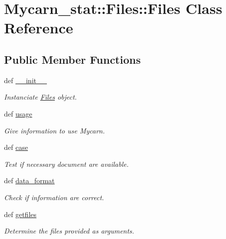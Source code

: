 \hypertarget{classMycarn__stat_1_1Files_1_1Files}{
\section{\-Mycarn\-\_\-stat\-:\-:\-Files\-:\-:\-Files \-Class \-Reference}
\label{classMycarn__stat_1_1Files_1_1Files}
}
\subsection*{\-Public \-Member \-Functions}
\begin{DoxyCompactItemize}
\item 
\hypertarget{classMycarn__stat_1_1Files_1_1Files_a7cd67ad22381b2c123d45d5304beee54}{
def \hyperlink{classMycarn__stat_1_1Files_1_1Files_a7cd67ad22381b2c123d45d5304beee54}{\-\_\-\-\_\-init\-\_\-\-\_\-}}
\label{classMycarn__stat_1_1Files_1_1Files_a7cd67ad22381b2c123d45d5304beee54}

\begin{DoxyCompactList}\small\item\em \-Instanciate \hyperlink{classMycarn__stat_1_1Files_1_1Files}{\-Files} object. \end{DoxyCompactList}\item 
def \hyperlink{classMycarn__stat_1_1Files_1_1Files_a1990cf7e7bb65bf6e1549e0664893791}{usage}
\begin{DoxyCompactList}\small\item\em \-Give information to use \-Mycarn. \end{DoxyCompactList}\item 
def \hyperlink{classMycarn__stat_1_1Files_1_1Files_a8441860b2a66df822dd34f19d2e38128}{case}
\begin{DoxyCompactList}\small\item\em \-Test if necessary document are available. \end{DoxyCompactList}\item 
\hypertarget{classMycarn__stat_1_1Files_1_1Files_aa4515e3e6292da2a679b93fa42027af4}{
def \hyperlink{classMycarn__stat_1_1Files_1_1Files_aa4515e3e6292da2a679b93fa42027af4}{data\-\_\-format}}
\label{classMycarn__stat_1_1Files_1_1Files_aa4515e3e6292da2a679b93fa42027af4}

\begin{DoxyCompactList}\small\item\em \-Check if information are correct. \end{DoxyCompactList}\item 
def \hyperlink{classMycarn__stat_1_1Files_1_1Files_a8217f7f3f71d944565774a2f49683ce8}{getfiles}
\begin{DoxyCompactList}\small\item\em \-Determine the files provided as arguments. \end{DoxyCompactList}\end{DoxyCompactItemize}
